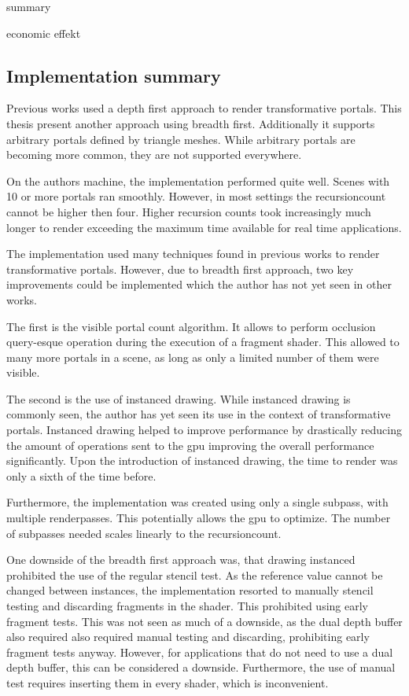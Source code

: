 summary




economic effekt

\subsection{Implementation summary}

Previous works used a depth first approach to render transformative portals. This thesis present another approach using breadth first. Additionally it supports arbitrary portals defined by triangle meshes. While arbitrary portals are becoming more common, they are not supported everywhere.

On the authors machine, the implementation performed quite well. Scenes with 10 or more portals ran smoothly. However, in most settings the \gls{recursioncount} cannot be higher then four. Higher recursion counts took increasingly much longer to render exceeding the maximum time available for real time applications.

The implementation used many techniques found in previous works to render transformative portals. However, due to breadth first approach, two key improvements could be implemented which the author has not yet seen in other works.

The first is the visible portal count algorithm. It allows to perform occlusion query-esque operation during the execution of a fragment shader. This allowed to many more portals in a scene, as long as only a limited number of them were visible. 

The second is the use of instanced drawing. While instanced drawing is commonly seen, the author has yet seen its use in the context of transformative portals. Instanced drawing helped to improve performance by drastically reducing the amount of operations sent to the \gls{gpu} improving the overall performance significantly. Upon the introduction of instanced drawing, the time to render was only a sixth of the time before.

Furthermore, the implementation was created using only a single subpass, with multiple renderpasses. This potentially allows the \gls{gpu} to optimize. The number of subpasses needed scales linearly to the \gls{recursioncount}.

One downside of the breadth first approach was, that drawing instanced prohibited the use of the regular stencil test. As the reference value cannot be changed between instances, the implementation resorted to manually stencil testing and discarding fragments in the shader. This prohibited using early fragment tests. This was not seen as much of a downside, as the dual depth buffer also required also required manual testing and discarding, prohibiting early fragment tests anyway. However, for applications that do not need to use a dual depth buffer, this can be considered a downside. Furthermore, the use of manual test requires inserting them in every shader, which is inconvenient.

